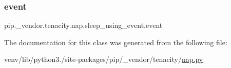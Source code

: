 \subsubsection{\texorpdfstring{event}{event}}
{\footnotesize\ttfamily pip.\+\_\+vendor.\+tenacity.\+nap.\+sleep\+\_\+using\+\_\+event.\+event}



The documentation for this class was generated from the following file\+:\begin{DoxyCompactItemize}
\item 
venv/lib/python3./site-\/packages/pip/\+\_\+vendor/tenacity/\hyperlink{nap_8py}{nap.\+py}\end{DoxyCompactItemize}
